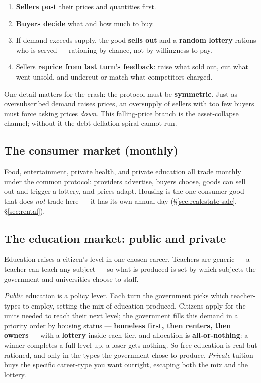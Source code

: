 \documentclass[11pt]{article}
\begin{document}
\begin{enumerate}
  \item \textbf{Sellers post} their prices and quantities first.
  \item \textbf{Buyers decide} what and how much to buy.
  \item If demand exceeds supply, the good \textbf{sells out} and a
  \textbf{random lottery} rations who is served --- rationing by chance, not by
  willingness to pay.
  \item Sellers \textbf{reprice from last turn's feedback}: raise what sold out,
  cut what went unsold, and undercut or match what competitors charged.
\end{enumerate}

One detail matters for the crash: the protocol must be \textbf{symmetric}. Just
as oversubscribed demand raises prices, an oversupply of sellers with too few
buyers must force asking prices \emph{down}. This falling-price branch is the
asset-collapse channel; without it the debt-deflation spiral cannot run.

\subsection{The consumer market (monthly)}

Food, entertainment, private health, and private education all trade monthly
under the common protocol: providers advertise, buyers choose, goods can sell
out and trigger a lottery, and prices adapt. Housing is the one consumer good
that does \emph{not} trade here --- it has its own annual day
(\S\ref{sec:realestate-sale}, \S\ref{sec:rental}).

\subsection{The education market: public and private}
\label{sec:education-market}

Education raises a citizen's level in one chosen career. Teachers are generic
--- a teacher can teach any subject --- so what is produced is set by which
subjects the government and universities choose to staff.

\emph{Public} education is a policy lever. Each turn the government picks which
teacher-types to employ, setting the mix of education produced. Citizens apply
for the units needed to reach their next level; the government fills this demand
in a priority order by housing status --- \textbf{homeless first, then renters,
then owners} --- with a \textbf{lottery} inside each tier, and allocation is
\textbf{all-or-nothing}: a winner completes a full level-up, a loser gets
nothing. So free education is real but rationed, and only in the types the
government chose to produce. \emph{Private} tuition buys the specific career-type
you want outright, escaping both the mix and the lottery.
\end{document}
